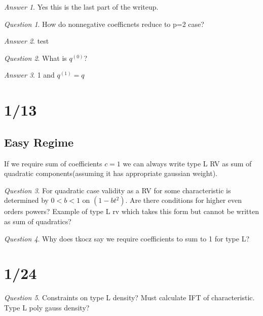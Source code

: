 \documentclass[11pt]{article}
\theoremstyle{remark}
\newtheorem*{quest}{Question}
\newtheorem*{ans}{Answer}
\begin{document}
\begin{ans}
	Yes this is the last part of the writeup.
\end{ans}

\begin{quest}
	How do nonnegative coefficnets reduce to p=2 case?
\end{quest}

\begin{ans}
	test
\end{ans}

\begin{quest}
	What is $q^{(0)}$?
\end{quest}
\begin{ans}
	1 and $q^{(1)} = q$
\end{ans}

\section{1/13}

\subsection{Easy Regime}

\begin{remark}
	If we require sum of coefficients $c=1$ we can always write type L RV as sum of quadratic components(assuming it has appropriate gaussian weight).
\end{remark}

\begin{quest}
	For quadratic case validity as a RV for some characteristic is determined by $0 < b < 1$ on $(1-bt^2)$. Are there conditions for higher even orders powers? Example of type L rv which takes this form but cannot be written as sum of quadratics?
\end{quest}

\begin{quest}
	Why does tkocz say we require coefficients to sum to 1 for type L?
\end{quest}

\section{1/24}

\begin{quest}
	Constraints on type L density? Must calculate IFT of characteristic. Type L poly gauss density?
\end{quest}
\end{document}
